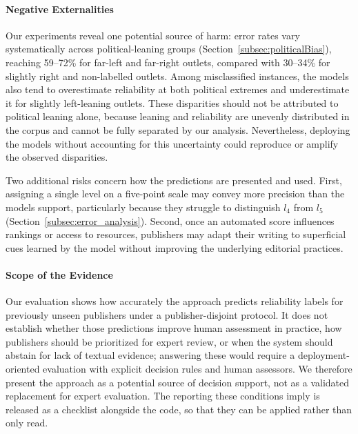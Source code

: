 \documentclass[runningheads]{llncs}
\begin{document}
\paragraph{Negative Externalities} Our experiments reveal one potential source of harm: error rates vary systematically across political-leaning groups (Section~\ref{subsec:politicalBias}), reaching 59--72\% for far-left and far-right outlets, compared with 30--34\% for slightly right and non-labelled outlets. Among misclassified instances, the models also tend to overestimate reliability at both political extremes and underestimate it for slightly left-leaning outlets. These disparities should not be attributed to political leaning alone, because leaning and reliability are unevenly distributed in the corpus and cannot be fully separated by our analysis. Nevertheless, deploying the models without accounting for this uncertainty could reproduce or amplify the observed disparities.

Two additional risks concern how the predictions are presented and used. First, assigning a single level on a five-point scale may convey more precision than the models support, particularly because they struggle to distinguish \(l_4\) from \(l_5\) (Section~\ref{subsec:error_analysis}). Second, once an automated score influences rankings or access to resources, publishers may adapt their writing to superficial cues learned by the model without improving the underlying editorial practices.


\paragraph{Scope of the Evidence} Our evaluation shows how accurately the approach predicts reliability labels for previously unseen publishers under a publisher-disjoint protocol. It does not establish whether those predictions improve human assessment in practice, how publishers should be prioritized for expert review, or when the system should abstain for lack of textual evidence; answering these would require a deployment-oriented evaluation with explicit decision rules and human assessors. We therefore present the approach as a potential source of decision support, not as a validated replacement for expert evaluation. The reporting these conditions imply is released as a checklist alongside the code, so that they can be applied rather than only read.
\end{document}
